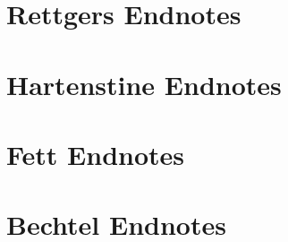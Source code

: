 \documentclass[11pt,letter]{book}
\begin{document}
\section{Rettgers Endnotes}

\footnotesize



\normalsize

\section{Hartenstine Endnotes}

\footnotesize



\normalsize

\section{Fett Endnotes}

\footnotesize



\normalsize

\section{Bechtel Endnotes}

\footnotesize



\normalsize
\end{document}
